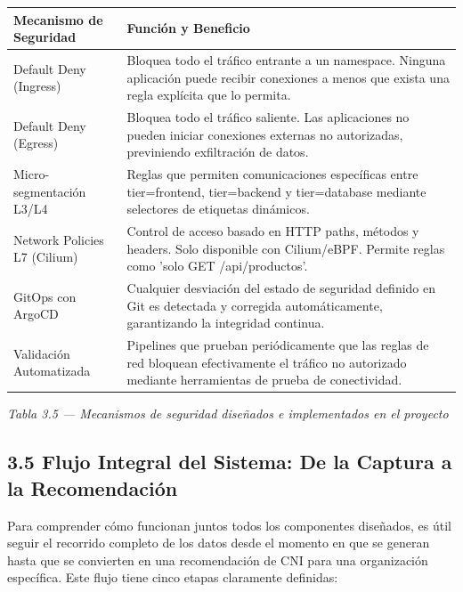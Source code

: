 \documentclass[journal]{IEEEtran}
\begin{document}
\begin{table}[htbp]
\centering
\scriptsize
\begin{tabularx}{\textwidth}{|Y|Y|}
\hline
\textbf{Mecanismo de Seguridad} & \textbf{Función y Beneficio} \\
\hline
Default Deny (Ingress) & Bloquea todo el tráfico entrante a un namespace. Ninguna aplicación puede recibir conexiones a menos que exista una regla explícita que lo permita. \\
Default Deny (Egress) & Bloquea todo el tráfico saliente. Las aplicaciones no pueden iniciar conexiones externas no autorizadas, previniendo exfiltración de datos. \\
Micro-segmentación L3/L4 & Reglas que permiten comunicaciones específicas entre tier=frontend, tier=backend y tier=database mediante selectores de etiquetas dinámicos. \\
Network Policies L7 (Cilium) & Control de acceso basado en HTTP paths, métodos y headers. Solo disponible con Cilium/eBPF. Permite reglas como 'solo GET /api/productos'. \\
GitOps con ArgoCD & Cualquier desviación del estado de seguridad definido en Git es detectada y corregida automáticamente, garantizando la integridad continua. \\
Validación Automatizada & Pipelines que prueban periódicamente que las reglas de red bloquean efectivamente el tráfico no autorizado mediante herramientas de prueba de conectividad. \\
\hline
\end{tabularx}
\end{table}

\begin{center}\emph{\emph{Tabla 3.5 --- Mecanismos de seguridad diseñados e implementados en el proyecto}}\end{center}

\subsection{3.5 Flujo Integral del Sistema: De la Captura a la Recomendación}

Para comprender cómo funcionan juntos todos los componentes diseñados, es útil seguir el recorrido completo de los datos desde el momento en que se generan hasta que se convierten en una recomendación de CNI para una organización específica. Este flujo tiene cinco etapas claramente definidas:
\end{document}
